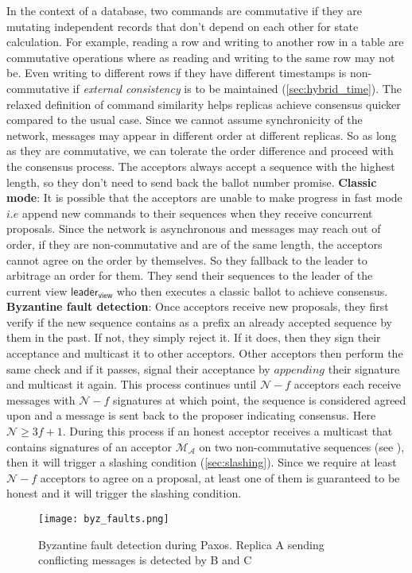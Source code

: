 In the context of a database, two commands are commutative if they are mutating independent records that don't depend on each other for state calculation. For example, reading a row and writing to another row in a table are commutative operations where as reading and writing to the same row may not be. Even writing to different rows if they have different timestamps is non-commutative if \textit{external consistency} is to be maintained (\cref{sec:hybrid_time}). The relaxed definition of command similarity helps replicas achieve consensus quicker compared to the usual case. Since we cannot assume synchronicity of the network, messages may appear in different order at different replicas. So as long as they are commutative, we can tolerate the order difference and proceed with the consensus process. The acceptors always accept a sequence with the highest length, so they don't need to send back the ballot number promise.
\newline\newline
\textbf{Classic mode}: It is possible that the acceptors are unable to make progress in fast mode $i.e$ append new commands to their sequences when they receive concurrent proposals. Since the network is asynchronous and messages may reach out of order, if they are non-commutative and are of the same length, the acceptors cannot agree on the order by themselves. So they fallback to the leader to arbitrage an order for them. They send their sequences to the leader of the current view $\textsf{leader}_\textsf{view}$ who then executes a classic ballot to achieve consensus.
\newline\newline
\textbf{Byzantine fault detection}: Once acceptors receive new proposals, they first verify if the new sequence contains as a prefix an already accepted sequence by them in the past. If not, they simply reject it. If it does, then they sign their acceptance and multicast it to other acceptors. Other acceptors then perform the same check and if it passes, signal their acceptance by $appending$ their signature and multicast it again. This process continues until $\mathcal{N} - f$ acceptors each receive messages with $\mathcal{N} - f$ signatures at which point, the sequence is considered agreed upon and a message is sent back to the proposer indicating consensus. Here $\mathcal{N} \ge 3f+1$. During this process if an honest acceptor receives a multicast that contains signatures of an acceptor $\mathcal{M_A}$ on two non-commutative sequences (see ), then it will trigger a slashing condition (\cref{sec:slashing}). Since we require at least $\mathcal{N} - f$ acceptors to agree on a proposal, at least one of them is guaranteed to be honest and it will trigger the slashing condition. 
\begin{figure}[h!] \centering
	\texttt{[image: byz\_faults.png]}
	\caption{Byzantine fault detection during Paxos. Replica A sending conflicting messages is detected by B and C}
	\label{fig:byz_faults}
\end{figure}

